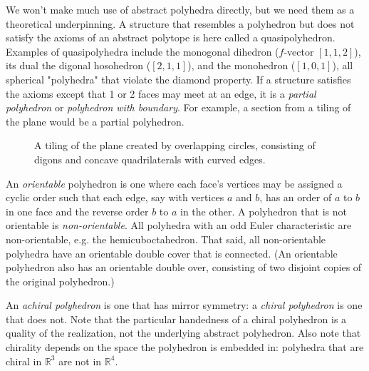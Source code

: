 \documentclass{amsart}[12pt]
\begin{document}
We won't make much use of abstract polyhedra directly, but we need them as a
theoretical underpinning. A structure that resembles a polyhedron but does not
satisfy the axioms of an abstract polytope is here called a quasipolyhedron.
Examples of quasipolyhedra include the monogonal dihedron ($f$-vector
$[1,1,2]$), its dual the digonal hosohedron ($[2,1,1]$), and the monohedron
($[1,0,1]$), all spherical "polyhedra" that violate the diamond property.
If a structure satisfies the axioms except that 1 or 2 faces may meet at an
edge, it is a \textit{partial polyhedron} or \textit{polyhedron with
boundary}. For example, a section from a tiling of the plane would be a
partial polyhedron.

\begin{figure}[!htbp]
\caption{A tiling of the plane created by overlapping circles, consisting of
digons and concave quadrilaterals with curved edges.}
\label{fig:circlesquare}
\end{figure}

An \textit{orientable} polyhedron is one where each face's vertices may be assigned a cyclic order such that each edge, say with vertices $a$ and $b$, has an order of $a$ to $b$ in one face and the reverse order $b$ to $a$ in the other. \cite{grunbaum94} A polyhedron that is not orientable is \textit{non-orientable}. All polyhedra with an odd Euler characteristic are non-orientable, e.g. the hemicuboctahedron. That said, all non-orientable polyhedra have an orientable double cover that is connected. (An orientable polyhedron also has an orientable double over, consisting of two disjoint copies of the original polyhedron.)

An \textit{achiral polyhedron} is one that has mirror symmetry:
a \textit{chiral polyhedron} is one that does not. Note that the particular
handedness of a chiral polyhedron is a quality of the realization, not the
underlying abstract polyhedron.
Also note that chirality depends on the space the polyhedron is embedded in:
polyhedra that are chiral in $\mathbb{R}^3$ are not in $\mathbb{R}^4$.
\end{document}
